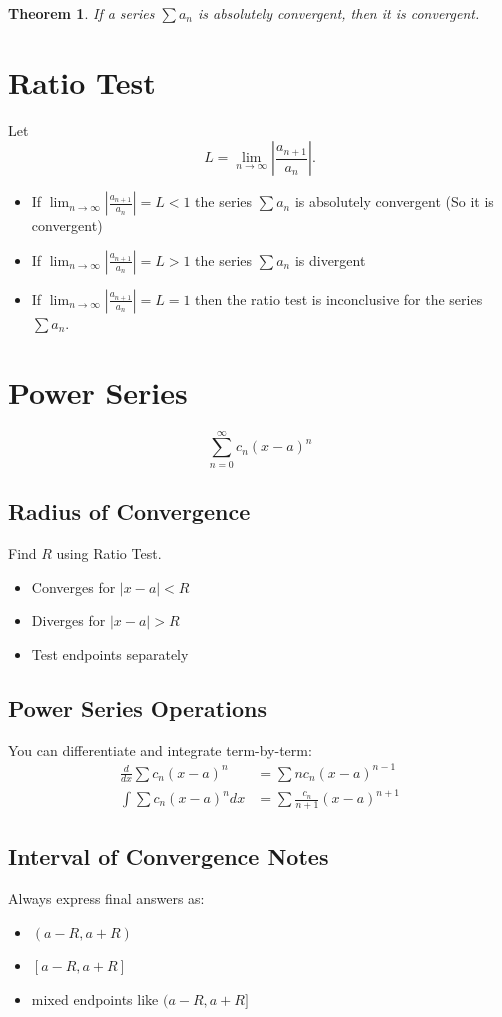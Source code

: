 \documentclass[11pt]{article}
\newtheorem{theorem}{Theorem}[section]
\theoremstyle{mydef}
\begin{document}
\begin{theorem}
If a series $\sum a_n$ is absolutely convergent, then it is convergent.
\end{theorem}


\section*{Ratio Test}

Let
\[
L=\lim_{n\to\infty}\left|\frac{a_{n+1}}{a_n}\right|.
\]

\begin{itemize}
\item If $\lim_{n\to\infty}\left|\frac{a_{n+1}}{a_n}\right|=L<1$ the series $\sum a_n$ is absolutely convergent (So it is convergent)
\item If $\lim_{n\to\infty}\left|\frac{a_{n+1}}{a_n}\right|=L>1$ the series $\sum a_n$ is divergent
\item If $\lim_{n\to\infty}\left|\frac{a_{n+1}}{a_n}\right|=L=1$ then the ratio test is inconclusive for the series $\sum a_n$.
\end{itemize}

\section*{Power Series}

\[
\sum_{n=0}^{\infty} c_n(x-a)^n
\]
\subsection*{Radius of Convergence}
Find $R$ using Ratio Test.

\begin{itemize}
\item Converges for $|x-a|<R$
\item Diverges for $|x-a|>R$
\item Test endpoints separately
\end{itemize}
\subsection*{Power Series Operations}
You can differentiate and integrate term-by-term:
\begin{align*}
\frac{d}{dx}\sum c_n(x-a)^n &= \sum n c_n (x-a)^{n-1} \\
\int \sum c_n(x-a)^n dx &= \sum \frac{c_n}{n+1}(x-a)^{n+1}
\end{align*}

\subsection*{Interval of Convergence Notes}
Always express final answers as:
\begin{itemize}
\item $(a-R, a+R)$
\item $[a-R, a+R]$
\item mixed endpoints like $(a-R, a+R]$
\end{itemize}
\end{document}
